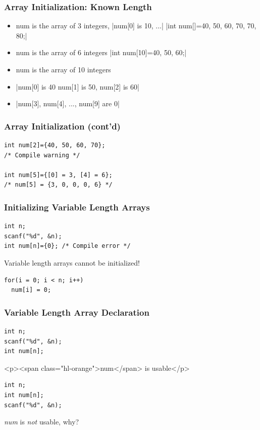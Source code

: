 \documentclass{../c-lecture}
\begin{document}
\begin{frame}[fragile]
  \frametitle{Array Initialization: Known Length}
  \begin{itemize}
    |int num[3]={10, 20, 60};|
    \item num is the array of 3 integers, |num[0] is 10, ...|
    |int num[]={40, 50, 60, 70, 70, 80};|
    \item num is the array of 6 integers
    |int num[10]={40, 50, 60};|
    \item num is the array of 10 integers
    \item {}|num[0] is 40 num[1] is 50, num[2] is 60|
    \item {}|num[3], num[4], ..., num[9] are 0|
  \end{itemize}
\end{frame}

\begin{frame}[fragile]
  \frametitle{Array Initialization (cont’d)}
  \begin{verbatim}
int num[2]={40, 50, 60, 70};
/* Compile warning */

int num[5]={[0] = 3, [4] = 6};
/* num[5] = {3, 0, 0, 0, 6} */
  \end{verbatim}
\end{frame}

\begin{frame}[fragile]
  \frametitle{Initializing Variable Length Arrays}
  \begin{verbatim}
int n;
scanf("%d", &n);
int num[n]={0}; /* Compile error */
  \end{verbatim}
  \begin{block}{}
    Variable length arrays cannot be initialized!
  \end{block}
  \begin{verbatim}
for(i = 0; i < n; i++)
  num[i] = 0;
  \end{verbatim}
\end{frame}

\begin{frame}[fragile]
  \frametitle{Variable Length Array Declaration}
  \begin{verbatim}
int n;
scanf("%d", &n);
int num[n];
  \end{verbatim}
  <p><span class="hl-orange">num</span> is usable</p>
  \begin{verbatim}
int n;
int num[n];
scanf("%d", &n);
  \end{verbatim}
  \begin{block}{}
    \textit{\color{Orange} num} is
    \textit{\color{RubineRed} not} usable, why?
  \end{block}
\end{frame}
\end{document}
